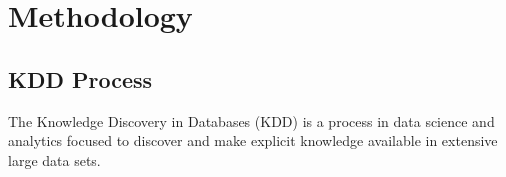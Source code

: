 
%
%
%
%




\chapter{Methodology}
\section{KDD Process}
The Knowledge Discovery in Databases (KDD) is a process in data science and analytics focused to discover and make explicit knowledge available in extensive large data sets. \cite{Wings:2024}

